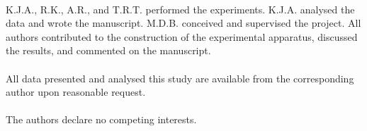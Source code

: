 \documentclass[pra,aps,showpacs,floatfix,twocolumn,nofootinbib,citeautoscript]{revtex4-1}
\begin{document}
\\
K.J.A., R.K., A.R., and T.R.T. performed the experiments. K.J.A. analysed the data and wrote the manuscript. M.D.B. conceived and supervised the project. All authors contributed to the construction of the experimental apparatus, discussed the results, and commented on the manuscript. \\

\\
All data presented and analysed this study are available from the corresponding author upon reasonable request.\\

\\
 The authors declare no competing interests.\\

%
%
\end{document}
